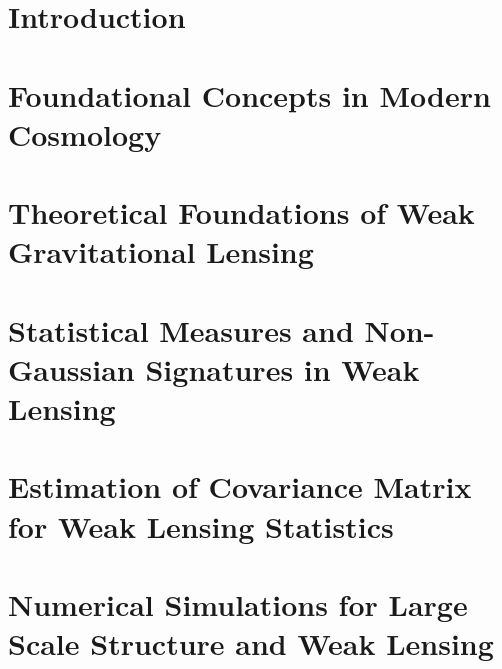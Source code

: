 \documentclass[11pt,a4paper]{ipmu}
\begin{document}
\makethesistitle
\frontmatter
\begin{abstractpage}
    
\end{abstractpage}





\clearpage


\tableofcontents  %
\listoffigures    %
\listoftables     %


\chapter{Introduction}
\label{chap:introduction}
\mainmatter
\minitoc 


\chapter{Foundational Concepts in Modern Cosmology}
\label{chap:cosmology}
\minitoc 


\chapter{Theoretical Foundations of Weak Gravitational Lensing}
\label{chap:weak_lensing}
\minitoc 


\chapter{Statistical Measures and Non-Gaussian Signatures in Weak Lensing}
\label{chap:statistics}
\minitoc 


\chapter{Estimation of Covariance Matrix for Weak Lensing Statistics}
\label{chap:covariance}
\minitoc 


\chapter{Numerical Simulations for Large Scale Structure and Weak Lensing}
\label{chap:simulation}
\minitoc 

\end{document}
